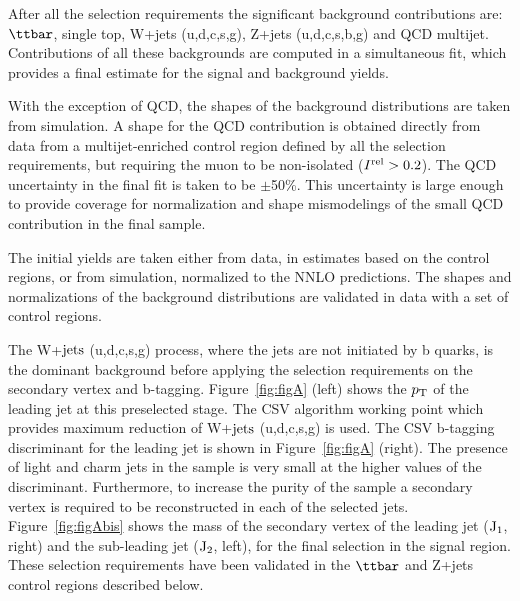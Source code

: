 After all the selection requirements the significant background 
contributions are:
$\ttbar$, single top, W+jets (u,d,c,s,g), Z+jets (u,d,c,s,b,g) and QCD multijet. 
Contributions of all these backgrounds 
are computed in 
a simultaneous fit, which provides a final estimate for the signal and background yields.

With the exception of QCD, the shapes of the background distributions are taken from simulation. 
A shape for the QCD contribution is obtained directly from  data  from 
a multijet-enriched control region
defined by all the selection requirements, but
requiring the muon to be non-isolated ($I^{\rm{rel}}>0.2$). The QCD uncertainty in the 
final fit is taken to be $\pm$50\%. This uncertainty is large enough to provide coverage for 
normalization and shape mismodelings of the small QCD contribution in the final sample.

The initial yields are taken either from data, in estimates based on the 
control regions, or from simulation, normalized to the NNLO predictions.
The shapes and normalizations of the background distributions
are validated in data with a set of control regions.

The W+$\rm{jets}$ (u,d,c,s,g) process, where the jets are not initiated by b quarks,
is the dominant background before applying the selection requirements on the secondary vertex and
b-tagging. Figure~\ref{fig:figA} (left) shows the $p_\mathrm{T}$ of the leading jet at 
this preselected stage. The CSV algorithm working point which provides maximum reduction of 
W+$\rm{jets}$ (u,d,c,s,g) is used. 
The CSV b-tagging discriminant for the leading jet is shown in Figure~\ref{fig:figA} (right). The presence of light and charm jets
in the sample is very small at the higher values of the discriminant.
Furthermore, to increase the purity of the sample %
a secondary vertex is required to be reconstructed in each of the selected jets.
Figure~\ref{fig:figAbis} shows the mass of the secondary vertex of the leading jet ($\rm{J_{1}}$, right) and the sub-leading jet ($\rm{J_{2}}$, left), for the final selection
in the signal region.
These selection requirements have been validated in the $\ttbar$ and Z+jets control regions
described below. 

